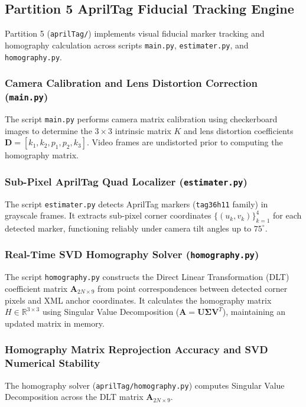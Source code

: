 \subsection{Partition 5 AprilTag Fiducial Tracking Engine}
Partition 5 (\texttt{aprilTag/}) implements visual fiducial marker tracking and homography calculation across scripts \texttt{main.py}, \texttt{estimater.py}, and \texttt{homography.py}.

\subsubsection{Camera Calibration and Lens Distortion Correction (\texttt{main.py})}
The script \texttt{main.py} performs camera matrix calibration using checkerboard images to determine the $3 \times 3$ intrinsic matrix $K$ and lens distortion coefficients $\mathbf{D} = [k_1, k_2, p_1, p_2, k_3]$. Video frames are undistorted prior to computing the homography matrix.

\subsubsection{Sub-Pixel AprilTag Quad Localizer (\texttt{estimater.py})}
The script \texttt{estimater.py} detects AprilTag markers (\texttt{tag36h11} family) in grayscale frames. It extracts sub-pixel corner coordinates $\{(u_k, v_k)\}_{k=1}^4$ for each detected marker, functioning reliably under camera tilt angles up to $75^\circ$.

\subsubsection{Real-Time SVD Homography Solver (\texttt{homography.py})}
The script \texttt{homography.py} constructs the Direct Linear Transformation (DLT) coefficient matrix $\mathbf{A}_{2N \times 9}$ from point correspondences between detected corner pixels and XML anchor coordinates. It calculates the homography matrix $H \in \mathbb{R}^{3 \times 3}$ using Singular Value Decomposition ($\mathbf{A} = \mathbf{U}\mathbf{\Sigma}\mathbf{V}^T$), maintaining an updated matrix in memory.

\subsubsection{Homography Matrix Reprojection Accuracy and SVD Numerical Stability}
The homography solver (\texttt{aprilTag/homography.py}) computes Singular Value Decomposition across the DLT matrix $\mathbf{A}_{2N \times 9}$.

